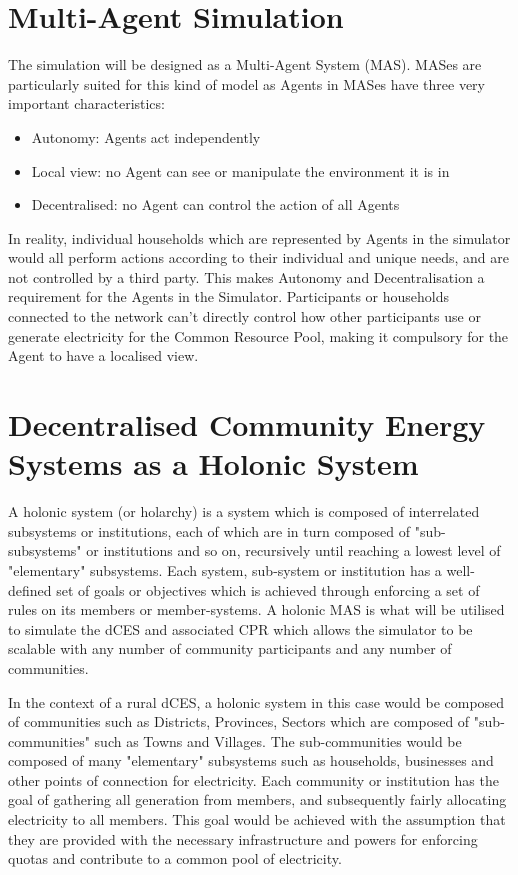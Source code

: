 \section*{Multi-Agent Simulation}
The simulation will be designed as a Multi-Agent System (MAS). MASes are particularly suited for this kind of model as Agents in MASes have three very important characteristics:
\begin{itemize}
	\item Autonomy: Agents act independently
	\item Local view: no Agent can see or manipulate the environment it is in
	\item Decentralised: no Agent can control the action of all Agents
\end{itemize}
In reality, individual households which are represented by Agents in the simulator would all perform actions according to their individual and unique needs, and are not controlled by a third party. This makes Autonomy and Decentralisation a requirement for the Agents in the Simulator. Participants or households connected to the network can't directly control how other participants use or generate electricity for the Common Resource Pool, making it compulsory for the Agent to have a localised view. 

\section*{Decentralised Community Energy Systems as a Holonic System}
A holonic system (or holarchy) is a system which is composed of interrelated subsystems or institutions, each of which are in turn composed of "sub-subsystems"  or institutions and so on, recursively until reaching a lowest level of "elementary" subsystems. Each system, sub-system or institution has a well-defined set of goals or objectives which is achieved through enforcing a set of rules on its members or member-systems\cite{Pitt:Holonic_Institutions}. A holonic MAS is what will be utilised to simulate the dCES and associated CPR which allows the simulator to be scalable with any number of community participants and any number of communities. 

In the context of a rural dCES, a holonic system in this case would be composed of communities such as Districts, Provinces, Sectors which are composed of "sub-communities" such as Towns and Villages. The sub-communities would be composed of many "elementary" subsystems such as households, businesses and other points of connection for electricity. Each community or institution has the goal of gathering all generation from members, and subsequently fairly allocating electricity to all members. This goal would be achieved with the assumption that they are provided with the necessary infrastructure and powers for enforcing quotas and contribute to a common pool of electricity.

